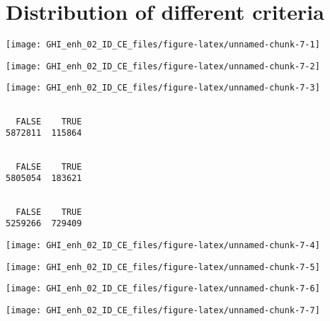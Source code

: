 \documentclass[
  10pt,
  a4paper,oneside]{article}
\begin{document}
\FloatBarrier

\hypertarget{distribution-of-different-criteria}{%
\section{Distribution of different criteria}\label{distribution-of-different-criteria}}

\begin{center}\texttt{[image: GHI\_enh\_02\_ID\_CE\_files/figure-latex/unnamed-chunk-7-1]} \end{center}

\begin{center}\texttt{[image: GHI\_enh\_02\_ID\_CE\_files/figure-latex/unnamed-chunk-7-2]} \end{center}

\begin{center}\texttt{[image: GHI\_enh\_02\_ID\_CE\_files/figure-latex/unnamed-chunk-7-3]} \end{center}

\begin{verbatim}

  FALSE    TRUE 
5872811  115864 
\end{verbatim}

\begin{verbatim}

  FALSE    TRUE 
5805054  183621 
\end{verbatim}

\begin{verbatim}

  FALSE    TRUE 
5259266  729409 
\end{verbatim}

\begin{center}\texttt{[image: GHI\_enh\_02\_ID\_CE\_files/figure-latex/unnamed-chunk-7-4]} \end{center}

\begin{center}\texttt{[image: GHI\_enh\_02\_ID\_CE\_files/figure-latex/unnamed-chunk-7-5]} \end{center}

\begin{center}\texttt{[image: GHI\_enh\_02\_ID\_CE\_files/figure-latex/unnamed-chunk-7-6]} \end{center}

\begin{center}\texttt{[image: GHI\_enh\_02\_ID\_CE\_files/figure-latex/unnamed-chunk-7-7]} \end{center}
\end{document}
